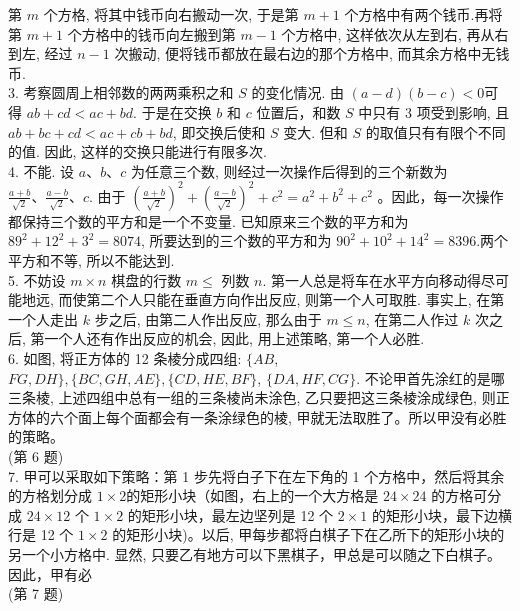 \documentclass[10pt]{article}
\begin{document}
第 $m$ 个方格, 将其中钱币向右搬动一次, 于是第 $m+1$ 个方格中有两个钱币.再将第 $m+1$ 个方格中的钱币向左搬到第 $m-1$ 个方格中, 这样依次从左到右, 再从右到左, 经过 $n-1$ 次搬动, 便将钱币都放在最右边的那个方格中, 而其余方格中无钱币.\\
3. 考察圆周上相邻数的两两乘积之和 $S$ 的变化情况. 由 $(a-d)(b-c)<0$可得 $a b+c d<a c+b d$. 于是在交换 $b$ 和 $c$ 位置后，和数 $S$ 中只有 3 项受到影响, 且 $a b+b c+c d<a c+c b+b d$, 即交换后使和 $S$ 变大. 但和 $S$ 的取值只有有限个不同的值. 因此, 这样的交换只能进行有限多次.\\
4. 不能. 设 $a 、 b 、 c$ 为任意三个数, 则经过一次操作后得到的三个新数为 $\frac{a+b}{\sqrt{2}} 、 \frac{a-b}{\sqrt{2}} 、 c$. 由于 $\left(\frac{a+b}{\sqrt{2}}\right)^{2}+\left(\frac{a-b}{\sqrt{2}}\right)^{2}+c^{2}=a^{2}+b^{2}+c^{2}$ 。因此，每一次操作都保持三个数的平方和是一个不变量. 已知原来三个数的平方和为 $89^{2}+12^{2}+3^{2}=8074$, 所要达到的三个数的平方和为 $90^{2}+10^{2}+14^{2}=8396$.两个平方和不等, 所以不能达到.\\
5. 不妨设 $m \times n$ 棋盘的行数 $m \leqslant$ 列数 $n$. 第一人总是将车在水平方向移动得尽可能地远, 而使第二个人只能在垂直方向作出反应, 则第一个人可取胜. 事实上, 在第一个人走出 $k$ 步之后, 由第二人作出反应, 那么由于 $m \leqslant n$, 在第二人作过 $k$ 次之后, 第一个人还有作出反应的机会, 因此, 用上述策略, 第一个人必胜.\\
6. 如图, 将正方体的 12 条棱分成四组: $\{A B$, $F G, D H\},\{B C, G H, A E\},\{C D, H E, B F\}$, $\{D A, H F, C G\}$. 不论甲首先涂红的是哪三条棱, 上述四组中总有一组的三条棱尚未涂色, 乙只要把这三条棱涂成绿色, 则正方体的六个面上每个面都会有一条涂绿色的棱, 甲就无法取胜了。所以甲没有必胜的策略。\\
(第 6 题)\\
7. 甲可以采取如下策略：第 1 步先将白子下在左下角的 1 个方格中，然后将其余的方格划分成 $1 \times 2$的矩形小块（如图，右上的一个大方格是 $24 \times 24$ 的方格可分成 $24 \times 12$ 个 $1 \times 2$ 的矩形小块，最左边坚列是 12 个 $2 \times 1$ 的矩形小块，最下边横行是 12 个 $1 \times 2$ 的矩形小块)。以后, 甲每步都将白棋子下在乙所下的矩形小块的另一个小方格中. 显然, 只要乙有地方可以下黑棋子，甲总是可以随之下白棋子。因此，甲有必\\
(第 7 题)
\end{document}
